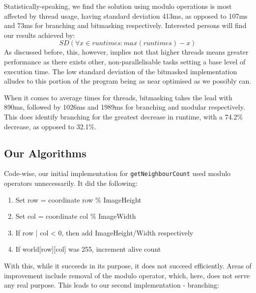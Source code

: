 \documentclass[twoside,twocolumn]{article}
\begin{document}
Statistically-speaking, we find the solution using 
modulo operations is most affected by thread usage, having standard deviation 413ms, as opposed to 107ms 
and 73ms for branching and bitmasking respectively. Interested persons will find our results achieved by:
\[SD(\forall x \in runtimes : max(runtimes) - x)\]
As discussed before, this, however, implies not that higher threads means greater 
performance as there exists other, non-parallelisable tasks setting a base level of execution time. 
The low standard deviation of the bitmasked implementation alludes to this portion of the program being as 
near optimised as we possibly can. 

When it comes to average times for threads, bitmasking takes the lead with
890ms, followed by 1026ms and 1989ms for branching and modular respectively. This does identify branching for the 
greatest decrease in runtime, with a 74.2\% decrease, as opposed to 32.1\%.

\subsection{Our Algorithms}

Code-wise, our initial implementation for \texttt{getNeighbourCount} used modulo operators unnecessarily. It did the following:
\begin{enumerate}[noitemsep]
  \item Set row = coordinate row \% ImageHeight
  \item Set col = coordinate col \% ImageWidth
  \item If row | col < 0, then add ImageHeight/Width respectively
  \item If world[row][col] was 255, increment alive count
\end{enumerate}

With this, while it succeeds in its purpose, it does not
succeed efficiently. Areas of improvement include removal of the modulo operator, which, here,
does not serve any real purpose. This leads to our second implementation - branching:
\end{document}
